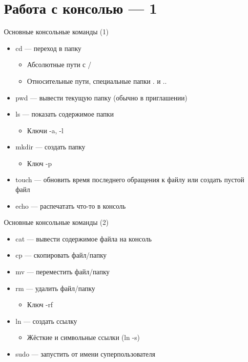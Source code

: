 \documentclass{../../slides-style}
\begin{document}
    \section{Работа с консолью --- 1}

    \begin{frame}{Основные консольные команды (1)}
        \begin{itemize}
            \item cd --- переход в папку
            \begin{itemize}
                \item Абсолютные пути с /
                \item Относительные пути, специальные папки . и ..
            \end{itemize}
            \item pwd --- вывести текущую папку (обычно в приглашении)
            \item ls --- показать содержимое папки
            \begin{itemize}
                \item Ключи -a, -l
            \end{itemize}
            \item mkdir --- создать папку
            \begin{itemize}
                \item Ключ -p
            \end{itemize}
            \item touch --- обновить время последнего обращения к файлу или создать пустой файл
            \item echo --- распечатать что-то в консоль
        \end{itemize}
    \end{frame}

    \begin{frame}{Основные консольные команды (2)}
        \begin{itemize}
            \item cat --- вывести содержимое файла на консоль
            \item cp --- скопировать файл/папку
            \item mv --- переместить файл/папку
            \item rm --- удалить файл/папку
            \begin{itemize}
                \item Ключ -rf
            \end{itemize}
            \item ln --- создать ссылку
            \begin{itemize}
                \item Жёсткие и символьные ссылки (ln -s)
            \end{itemize}
            \item sudo --- запустить от имени суперпользователя
        \end{itemize}
    \end{frame}
\end{document}
